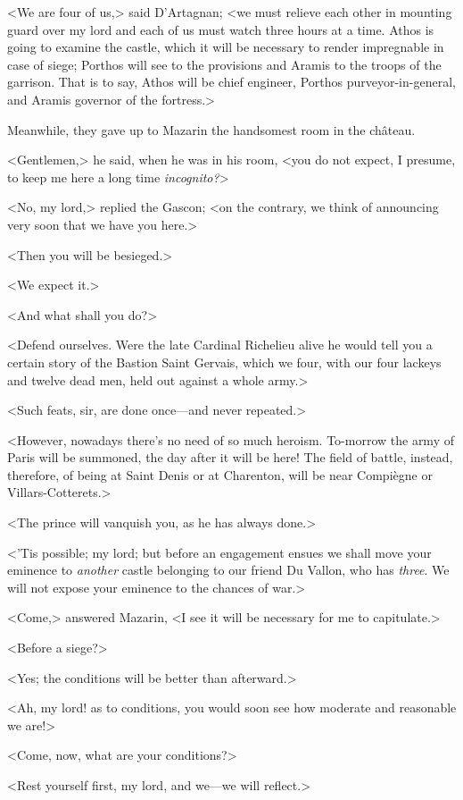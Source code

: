 <We are four of us,> said D'Artagnan; <we must relieve each other in mounting guard over my lord and each of us must watch three hours at a time. Athos is going to examine the castle, which it will be necessary to render impregnable in case of siege; Porthos will see to the provisions and Aramis to the troops of the garrison. That is to say, Athos will be chief engineer, Porthos purveyor-in-general, and Aramis governor of the fortress.>

Meanwhile, they gave up to Mazarin the handsomest room in the château.

<Gentlemen,> he said, when he was in his room, <you do not expect, I presume, to keep me here a long time \textit{incognito?}>

<No, my lord,> replied the Gascon; <on the contrary, we think of announcing very soon that we have you here.>

<Then you will be besieged.>

<We expect it.>

<And what shall you do?>

<Defend ourselves. Were the late Cardinal Richelieu alive he would tell you a certain story of the Bastion Saint Gervais, which we four, with our four lackeys and twelve dead men, held out against a whole army.>

<Such feats, sir, are done once—and never repeated.>

<However, nowadays there's no need of so much heroism. To-morrow the army of Paris will be summoned, the day after it will be here! The field of battle, instead, therefore, of being at Saint Denis or at Charenton, will be near Compiègne or Villars-Cotterets.>

<The prince will vanquish you, as he has always done.>

<'Tis possible; my lord; but before an engagement ensues we shall move your eminence to \textit{another} castle belonging to our friend Du Vallon, who has \textit{three}. We will not expose your eminence to the chances of war.>

<Come,> answered Mazarin, <I see it will be necessary for me to capitulate.>

<Before a siege?>

<Yes; the conditions will be better than afterward.>

<Ah, my lord! as to conditions, you would soon see how moderate and reasonable we are!>

<Come, now, what are your conditions?>

<Rest yourself first, my lord, and we—we will reflect.>

